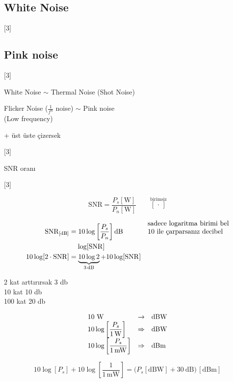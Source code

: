 \documentclass[11pt,a4paper]{article}
\begin{document}
\subsection{White Noise}
[3]

\subsection{Pink noise}
[3]

White Noise $\sim$ Thermal Noise (Shot Noise) 

Flicker Noise ($\frac{1}{f^{n}}$ noise) $\sim$ Pink noise \\
(Low frequency)

+ üst üste çizersek

[3]

SNR oranı

[3]

\[
\mathrm{SNR} = \frac{P_s[\mathrm{W}]}{P_n[\mathrm{W}]} \qquad \overset{\text{birimsiz}}{[\,\cdot\,]}
\]

\begin{align*}
\mathrm{SNR}_{[\mathrm{dB}]} &= 10\log\left[\frac{P_s}{P_n}\right]\mathrm{dB} && \text{\shortstack[l]{sadece logaritma birimi bel\\ 10 ile çarparsanız decibel}}\\
& \phantom{=}\ \log[\mathrm{SNR}] \\
10\log[2\cdot\mathrm{SNR}] &= \underbrace{10\log 2}_{3\,\mathrm{dB}} + 10\log[\mathrm{SNR}]
\end{align*}

2 kat arttırırsak 3 db \\
10 kat 10 db \quad \okunamadi{} \\
100 kat 20 db

\[
\begin{array}{@{}l@{\quad}l@{\quad}l@{}}
10\ \mathrm{W} & \rightarrow & \mathrm{dBW}\\
10\log\left[\dfrac{P_s}{1\,\mathrm{W}}\right] & \Rightarrow & \mathrm{dBW}\\
10\log\left[\dfrac{P_s}{1\,\mathrm{mW}}\right] & \Rightarrow & \mathrm{dBm}
\end{array}
\]

\[
10\log[P_s] + 10\log\left[\frac{1}{1\,\mathrm{mW}}\right] = \bigl(P_s[\mathrm{dBW}] + 30\ \mathrm{dB}\bigr)\,[\mathrm{dBm}]
\]
\end{document}
